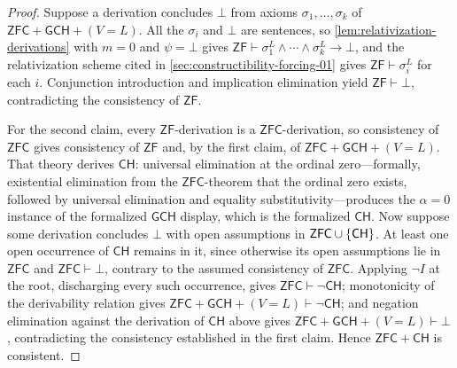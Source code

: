 \documentclass[11pt,oneside,openany]{book}
\theoremstyle{definition}
\theoremstyle{plain}
\theoremstyle{remark}
\DeclarePairedDelimiter{\set}{\lbrace}{\rbrace}
\newcommand{\derives}{\vdash}
\newcommand{\bottom}{\bot}
\newcommand{\ZF}{\mathsf{ZF}}
\newcommand{\ZFC}{\mathsf{ZFC}}
\begin{document}
\begin{proof}
Suppose a derivation concludes \(\bottom\) from axioms
\(\sigma_1,\ldots,\sigma_k\) of \(\ZFC+\mathsf{GCH}+(V=L)\).  All the
\(\sigma_i\) and \(\bottom\) are sentences, so
\cref{lem:relativization-derivations} with \(m=0\) and \(\psi=\bottom\)
gives
\(\ZF\derives\sigma_1^{L}\land\cdots\land\sigma_k^{L}\to\bottom\), and the
relativization scheme cited in \cref{sec:constructibility-forcing-01}
gives \(\ZF\derives\sigma_i^{L}\) for each \(i\).  Conjunction
introduction and implication elimination yield \(\ZF\derives\bottom\),
contradicting the consistency of \(\ZF\).

For the second claim, every \(\ZF\)-derivation is a \(\ZFC\)-derivation,
so consistency of \(\ZFC\) gives consistency of \(\ZF\) and, by the first
claim, of \(\ZFC+\mathsf{GCH}+(V=L)\).  That theory derives
\(\mathsf{CH}\): universal elimination at the ordinal zero---formally,
existential elimination from the \(\ZFC\)-theorem that the ordinal zero
exists, followed by universal elimination and equality
substitutivity---produces the \(\alpha=0\) instance of the formalized
\(\mathsf{GCH}\) display, which is the formalized \(\mathsf{CH}\).  Now
suppose some derivation concludes \(\bottom\) with open assumptions in
\(\ZFC\cup\set{\mathsf{CH}}\).  At least one open occurrence of
\(\mathsf{CH}\) remains in it, since otherwise its open assumptions lie in
\(\ZFC\) and \(\ZFC\derives\bottom\), contrary to the assumed consistency
of \(\ZFC\).  Applying \(\neg I\) at the root, discharging every such
occurrence, gives \(\ZFC\derives\neg\mathsf{CH}\); monotonicity of the
derivability relation gives
\(\ZFC+\mathsf{GCH}+(V=L)\derives\neg\mathsf{CH}\); and negation
elimination against the derivation of \(\mathsf{CH}\) above gives
\(\ZFC+\mathsf{GCH}+(V=L)\derives\bottom\), contradicting the consistency
established in the first claim.  Hence \(\ZFC+\mathsf{CH}\) is
consistent.
\end{proof}
\end{document}
